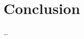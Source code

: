 \documentclass{ifacconf}
\begin{document}
\section{Conclusion}
\label{sec:conclusion}

\dots

\end{document}
